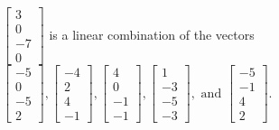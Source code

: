 \begin{exercise}
\begin{exerciseStatement}
  \end{exerciseStatement}
  \begin{exerciseAnswer}
   \(\left[\begin{array}{c}
3 \\
0 \\
-7 \\
0
\end{array}\right]\) 
  	 is  
	a linear combination of the vectors \(\left[\begin{array}{c}
-5 \\
0 \\
-5 \\
2
\end{array}\right] , \left[\begin{array}{c}
-4 \\
2 \\
4 \\
-1
\end{array}\right] , \left[\begin{array}{c}
4 \\
0 \\
-1 \\
-1
\end{array}\right] , \left[\begin{array}{c}
1 \\
-3 \\
-5 \\
-3
\end{array}\right] , \text{ and } \left[\begin{array}{c}
-5 \\
-1 \\
4 \\
2
\end{array}\right]\).

	
  


  \end{exerciseAnswer}
\end{exercise}